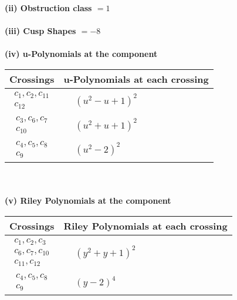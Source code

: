 \documentclass[1p]{elsarticle_modified}
\theoremstyle{definition}
\begin{document}
\flushleft \textbf{(ii) Obstruction class $= 1$}\\~\\
\flushleft \textbf{(iii) Cusp Shapes $= -8$}\\~\\
\newpage\renewcommand{\arraystretch}{1}
\flushleft \textbf{(iv) u-Polynomials at the component}\newline \\
\begin{tabular}{m{50pt}|m{274pt}}
Crossings & \hspace{64pt}u-Polynomials at each crossing \\
\hline $$\begin{aligned}c_{1},c_{2},c_{11}\\c_{12}\end{aligned}$$&$\begin{aligned}
&(u^2- u+1)^2
\end{aligned}$\\
\hline $$\begin{aligned}c_{3},c_{6},c_{7}\\c_{10}\end{aligned}$$&$\begin{aligned}
&(u^2+u+1)^2
\end{aligned}$\\
\hline $$\begin{aligned}c_{4},c_{5},c_{8}\\c_{9}\end{aligned}$$&$\begin{aligned}
&(u^2-2)^2
\end{aligned}$\\
\hline
\end{tabular}\\~\\
\newpage\renewcommand{\arraystretch}{1}
\flushleft \textbf{(v) Riley Polynomials at the component}\newline \\
\begin{tabular}{m{50pt}|m{274pt}}
Crossings & \hspace{64pt}Riley Polynomials at each crossing \\
\hline $$\begin{aligned}c_{1},c_{2},c_{3}\\c_{6},c_{7},c_{10}\\c_{11},c_{12}\end{aligned}$$&$\begin{aligned}
&(y^2+y+1)^2
\end{aligned}$\\
\hline $$\begin{aligned}c_{4},c_{5},c_{8}\\c_{9}\end{aligned}$$&$\begin{aligned}
&(y-2)^4
\end{aligned}$\\
\hline
\end{tabular}\\~\\
\end{document}
